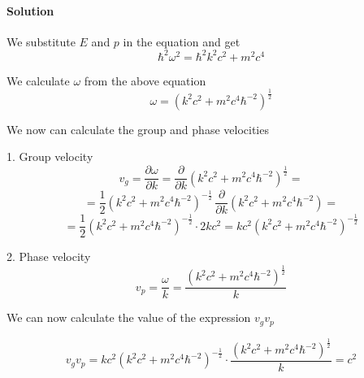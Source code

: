 \documentclass{article}
\begin{document}
\paragraph{Solution}

We substitute $E$ and $p$ in the equation and get
\[ \hbar^2 \omega^2 = \hbar^2 k^2 c^2 + m^2 c^4 \]

We calculate $\omega$ from the above equation
\[ \omega = \left( k^2 c^2 + m^2 c^4 \hbar^{-2}  \right)^{\frac{1}{2}} \] 

We now can calculate the group and phase velocities

1. Group velocity
\[ v_g = \frac{\partial \omega}{\partial k} = \frac{\partial}{\partial k} \left( k^2 c^2 + m^2 c^4 \hbar^{-2} \right)^{\frac{1}{2}} = \]
\[ = \frac{1}{2} \left( k^2 c^2 + m^2 c^4 \hbar^{-2} \right)^{-\frac{1}{2}} \, \frac{\partial}{\partial k} \left( k^2 c^2 + m^2 c^4 \hbar^{-2} \right) = \]
\[ = \frac{1}{2} \left( k^2 c^2 + m^2 c^4 \hbar^{-2} \right)^{-\frac{1}{2}} \cdot 2kc^2 = kc^2 \left( k^2 c^2 + m^2 c^4 \hbar^{-2} \right)^{-\frac{1}{2}} \]

2. Phase velocity
\[ v_p = \frac{\omega}{k} = \frac{\left( k^2 c^2 + m^2 c^4 \hbar^{-2} \right)^{\frac{1}{2}}}{k} \]

We can now calculate the value of the expression $v_g v_p$

\[ v_g v_p = kc^2 \left( k^2 c^2 + m^2 c^4 \hbar^{-2} \right)^{-\frac{1}{2}} \cdot \frac{\left( k^2 c^2 + m^2 c^4 \hbar^{-2} \right)^{\frac{1}{2}}}{k} = c^2 \]



\end{document}
